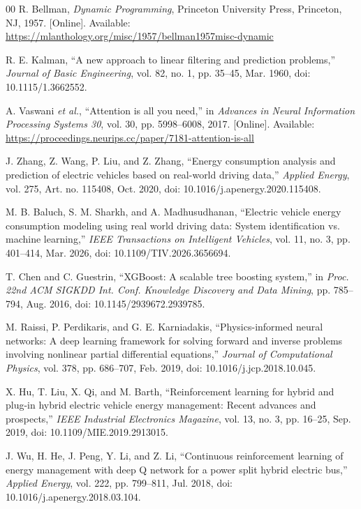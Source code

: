 \documentclass{ieeeaccess}
\begin{document}
\begin{thebibliography}{00}
 R. Bellman, \emph{Dynamic Programming}, Princeton University Press, Princeton, NJ, 1957. [Online]. Available: \url{https://mlanthology.org/misc/1957/bellman1957misc-dynamic}

 R. E. Kalman, ``A new approach to linear filtering and prediction problems,'' \emph{Journal of Basic Engineering}, vol. 82, no. 1, pp. 35--45, Mar. 1960, doi: 10.1115/1.3662552.

 A. Vaswani \emph{et al.}, ``Attention is all you need,'' in \emph{Advances in Neural Information Processing Systems 30}, vol. 30, pp. 5998--6008, 2017. [Online]. Available: \url{https://proceedings.neurips.cc/paper/7181-attention-is-all}

 J. Zhang, Z. Wang, P. Liu, and Z. Zhang, ``Energy consumption analysis and prediction of electric vehicles based on real-world driving data,'' \emph{Applied Energy}, vol. 275, Art. no. 115408, Oct. 2020, doi: 10.1016/j.apenergy.2020.115408.

 M. B. Baluch, S. M. Sharkh, and A. Madhusudhanan, ``Electric vehicle energy consumption modeling using real world driving data: System identification vs. machine learning,'' \emph{IEEE Transactions on Intelligent Vehicles}, vol. 11, no. 3, pp. 401--414, Mar. 2026, doi: 10.1109/TIV.2026.3656694.

 T. Chen and C. Guestrin, ``XGBoost: A scalable tree boosting system,'' in \emph{Proc. 22nd ACM SIGKDD Int. Conf. Knowledge Discovery and Data Mining}, pp. 785--794, Aug. 2016, doi: 10.1145/2939672.2939785.

 M. Raissi, P. Perdikaris, and G. E. Karniadakis, ``Physics-informed neural networks: A deep learning framework for solving forward and inverse problems involving nonlinear partial differential equations,'' \emph{Journal of Computational Physics}, vol. 378, pp. 686--707, Feb. 2019, doi: 10.1016/j.jcp.2018.10.045.

 X. Hu, T. Liu, X. Qi, and M. Barth, ``Reinforcement learning for hybrid and plug-in hybrid electric vehicle energy management: Recent advances and prospects,'' \emph{IEEE Industrial Electronics Magazine}, vol. 13, no. 3, pp. 16--25, Sep. 2019, doi: 10.1109/MIE.2019.2913015.

 J. Wu, H. He, J. Peng, Y. Li, and Z. Li, ``Continuous reinforcement learning of energy management with deep Q network for a power split hybrid electric bus,'' \emph{Applied Energy}, vol. 222, pp. 799--811, Jul. 2018, doi: 10.1016/j.apenergy.2018.03.104.


\end{thebibliography}
\end{document}
